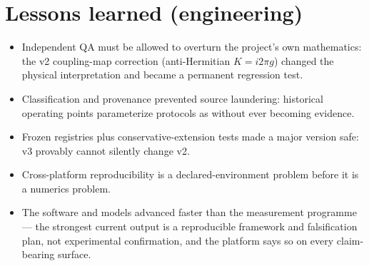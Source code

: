 \documentclass[10pt,letterpaper]{article}
\begin{document}
\section{Lessons learned (engineering)}
\begin{itemize}
\item Independent QA must be allowed to overturn the project's own
mathematics: the v2 coupling-map correction (anti-Hermitian $K = i 2\pi
g$) changed the physical interpretation and became a permanent
regression test.
\item Classification and provenance prevented source laundering:
historical operating points parameterize protocols as \SRC{} without
ever becoming evidence.
\item Frozen registries plus conservative-extension tests made a major
version safe: v3 provably cannot silently change v2.
\item Cross-platform reproducibility is a declared-environment problem
before it is a numerics problem.
\item The software and models advanced faster than the measurement
programme --- the strongest current output is a reproducible framework
and falsification plan, not experimental confirmation, and the platform
says so on every claim-bearing surface.
\end{itemize}



\end{document}
